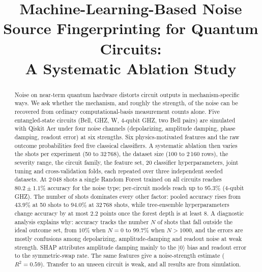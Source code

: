 \documentclass[conference]{IEEEtran}
\begin{document}
\title{Machine-Learning-Based Noise Source Fingerprinting for Quantum Circuits:\\ A Systematic Ablation Study}

\author{
}

\maketitle

\begin{abstract}
Noise on near-term quantum hardware distorts circuit outputs in mechanism-specific ways. We ask whether the mechanism, and roughly the strength, of the noise can be recovered from ordinary computational-basis measurement counts alone. Five entangled-state circuits (Bell, GHZ, W, 4-qubit GHZ, two Bell pairs) are simulated with Qiskit Aer under four noise channels (depolarizing, amplitude damping, phase damping, readout error) at six strengths. Six physics-motivated features and the raw outcome probabilities feed five classical classifiers. A systematic ablation then varies the shots per experiment (50 to 32\,768), the dataset size (100 to 2\,160 rows), the severity range, the circuit family, the feature set, 20 classifier hyperparameters, joint tuning and cross-validation folds, each repeated over three independent seeded datasets. At 2\,048 shots a single Random Forest trained on all circuits reaches $80.2\pm1.1\%$ accuracy for the noise type; per-circuit models reach up to $95.3\%$ (4-qubit GHZ). The number of shots dominates every other factor: pooled accuracy rises from $43.9\%$ at 50 shots to $94.0\%$ at 32\,768 shots, while tree-ensemble hyperparameters change accuracy by at most $2.2$ points once the forest depth is at least 8. A diagnostic analysis explains why: accuracy tracks the number $N$ of shots that fall outside the ideal outcome set, from $10\%$ when $N=0$ to $99.7\%$ when $N>1000$, and the errors are mostly confusions among depolarizing, amplitude-damping and readout noise at weak strength. SHAP attributes amplitude damping mainly to the $|0\rangle$ bias and readout error to the symmetric-swap rate. The same features give a noise-strength estimate ($R^2=0.59$). Transfer to an unseen circuit is weak, and all results are from simulation.
\end{abstract}
\end{document}

